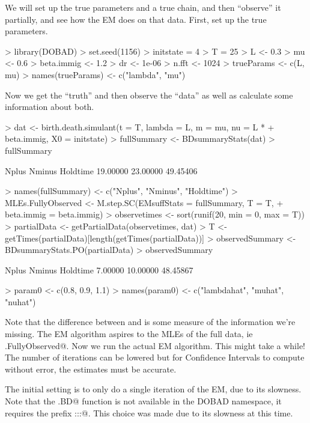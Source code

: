 \documentclass[12pt]{article}
\begin{document}
We will set up the true parameters and a true chain, and then ``observe'' it
partially, and see how the EM does on that data.
First, set up the true parameters.
\begin{Schunk}
\begin{Sinput}
> library(DOBAD)
> set.seed(1156)
> initstate = 4
> T = 25
> L <- 0.3
> mu <- 0.6
> beta.immig <- 1.2
> dr <- 1e-06
> n.fft <- 1024
> trueParams <- c(L, mu)
> names(trueParams) <- c("lambda", "mu")
\end{Sinput}
\end{Schunk}
Now we get the ``truth'' and then observe the ``data''
as well as calculate some information about both.
\begin{Schunk}
\begin{Sinput}
> dat <- birth.death.simulant(t = T, lambda = L, m = mu, nu = L * 
+    beta.immig, X0 = initstate)
> fullSummary <- BDsummaryStats(dat)
> fullSummary
\end{Sinput}
\begin{Soutput}
   Nplus   Nminus Holdtime 
19.00000 23.00000 49.45406 
\end{Soutput}
\begin{Sinput}
> names(fullSummary) <- c("Nplus", "Nminus", "Holdtime")
> MLEs.FullyObserved <- M.step.SC(EMsuffStats = fullSummary, T = T, 
+    beta.immig = beta.immig)
> observetimes <- sort(runif(20, min = 0, max = T))
> partialData <- getPartialData(observetimes, dat)
> T <- getTimes(partialData)[length(getTimes(partialData))]
> observedSummary <- BDsummaryStats.PO(partialData)
> observedSummary
\end{Sinput}
\begin{Soutput}
   Nplus   Nminus Holdtime 
 7.00000 10.00000 48.45867 
\end{Soutput}
\begin{Sinput}
> param0 <- c(0.8, 0.9, 1.1)
> names(param0) <- c("lambdahat", "muhat", "nuhat")
\end{Sinput}
\end{Schunk}


Note that the difference between \verb@fullSummary@ and
\verb@observedSummary@ is some measure of the information we're
missing.  The EM algorithm aspires to the MLEs of the full data, ie
\verb@MLEs.FullyObserved@.  Now we run the actual EM algorithm. This
might take a while!  The number of iterations can be lowered but for
Confidence Intervals to compute without error, the estimates must be
accurate.

The initial setting is to only do a single iteration of the EM, due to
its slowness.  Note that the \verb@EM.BD@ function is not available in
the DOBAD namespace, it requires the prefix \verb@DOBAD:::@.  This
choice was made due to its slowness at this time.
\end{document}
